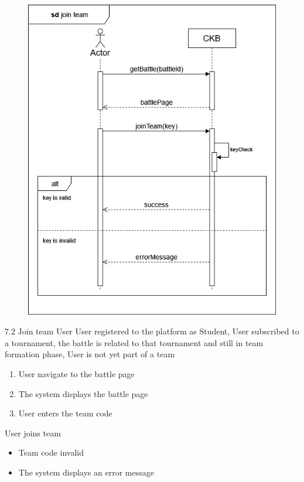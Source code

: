 \usecase
{
    \begin{figure}[H]
        \centering
        \includegraphics[width=\textwidth]{src/sd_diagrams/jointeam.png}
    \end{figure}
}
{7.2}
{Join team} %
{User} %
{User registered to the platform as Student, User subscribed to a tournament, the battle is related to that tournament and still in team formation phase, User is not yet part of a team} %
{ %
    \begin{enumerate}
        \item User navigate to the battle page
        \item The system displays the battle page
        \item User enters the team code
    \end{enumerate}
}
{User joins team} %
{ %
    \begin{itemize}
        \item Team code invalid
    \end{itemize}
}
{ %
    \begin{itemize}
        \item The system displays an error message
    \end{itemize}
}

